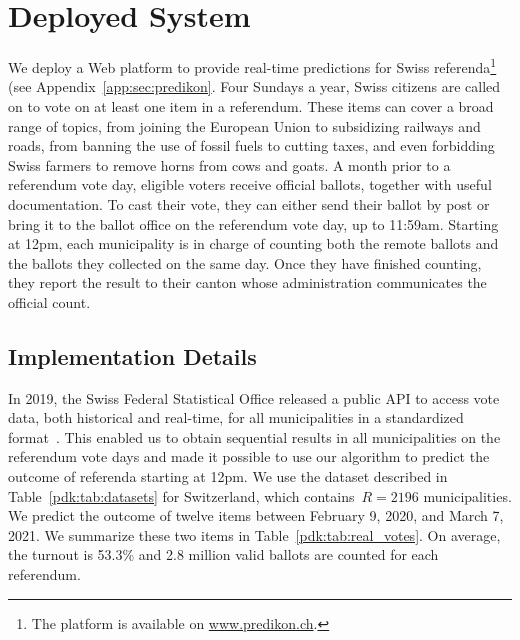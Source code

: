 \section{Deployed System}%
\label{pdk:sec:depsys}

We deploy a Web platform to provide real-time predictions for Swiss referenda\footnote{The platform is available on \href{http://www.predikon.ch}{www.predikon.ch}.} (see Appendix~\ref{app:sec:predikon}.
Four Sundays a year, Swiss citizens are called on to vote on at least one item in a referendum.
These items can cover a broad range of topics, from joining the European Union to subsidizing railways and roads, from banning the use of fossil fuels to cutting taxes, and even forbidding Swiss farmers to remove horns from cows and goats.
A month prior to a referendum vote day, eligible voters receive official ballots, together with useful documentation.
To cast their vote, they can either send their ballot by post or bring it to the ballot office on the referendum vote day, up to 11:59am.
Starting at 12pm, each municipality is in charge of counting both the remote ballots and the ballots they collected on the same day.
Once they have finished counting, they report the result to their canton whose administration communicates the official count.

\subsection{Implementation Details}

In 2019, the Swiss Federal Statistical Office released a public API to access vote data, both historical and real-time, for all municipalities in a standardized format~\cite{confederation2020open}.
This enabled us to obtain sequential results in all municipalities on the referendum vote days and made it possible to use our algorithm to predict the outcome of referenda starting at 12pm.
We use the dataset described in Table~\ref{pdk:tab:datasets} for Switzerland, which contains~$R = 2196$ municipalities.
We predict the outcome of twelve items between February 9, 2020, and March 7, 2021.
We summarize these two items in Table~\ref{pdk:tab:real_votes}.
On average, the turnout is 53.3\% and 2.8 million valid ballots are counted for each referendum.


